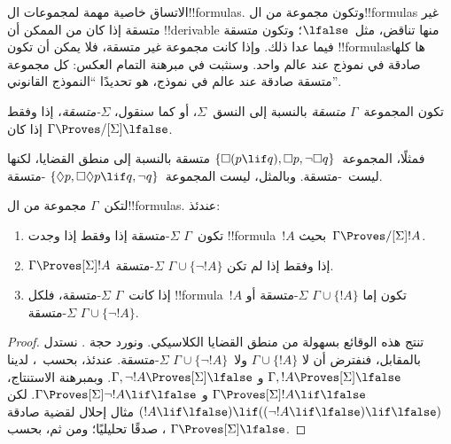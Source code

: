 \documentclass[../../../include/open-logic-section]{subfiles}
\begin{document}


الاتساق خاصية مهمة لمجموعات ال!!{formula}s. وتكون مجموعة من
ال!!{formula}s غير متسقة إذا كان من الممكن أن !!{derivable} منها تناقض،
مثل~$\lfalse$؛ وتكون متسقة فيما عدا ذلك. وإذا كانت مجموعة غير متسقة،
فلا يمكن أن تكون !!{formula}sها كلها صادقة في نموذج عند عالم واحد.
وسنثبت في مبرهنة التمام العكس: كل مجموعة متسقة صادقة عند عالم في نموذج،
هو تحديدًا ``النموذج القانوني''.

\begin{defn}
  تكون المجموعة~$\Gamma$ \emph{متسقة} بالنسبة إلى النسق~$\Sigma$، أو
  كما سنقول، \emph{$\Sigma$-متسقة}، إذا وفقط إذا كان
  $\Gamma \Proves/[\Sigma] \lfalse$.
\end{defn}

فمثلًا، المجموعة~$\{\Box(p \lif q), \Box p, \lnot\Box q\}$ متسقة
بالنسبة إلى منطق القضايا، لكنها ليست~-متسقة. وبالمثل، ليست
المجموعة~$\{\Diamond p, \Box\Diamond p \lif q, \lnot q\}$
-متسقة.

\begin{prop}
  لتكن~$\Gamma$ مجموعة من ال!!{formula}s. عندئذ:
  \begin{enumerate}
  \item تكون~$\Gamma$ $\Sigma$-متسقة إذا وفقط إذا وجدت
    !!{formula}~$!A$ بحيث~$\Gamma \Proves/[\Sigma] !A$.
  \item {}%
    $\Gamma \Proves[\Sigma] !A$ إذا وفقط إذا لم تكن
    $\Gamma \cup \{\lnot!A\}$ $\Sigma$-متسقة.
  \item {}%
    إذا كانت~$\Gamma$ $\Sigma$-متسقة، فلكل !!{formula}~$!A$ تكون إما
    $\Gamma \cup \{!A\}$ $\Sigma$-متسقة أو
    $\Gamma \cup \{\lnot!A\}$ $\Sigma$-متسقة.
  \end{enumerate}
\end{prop}

\begin{proof}
  تنتج هذه الوقائع بسهولة من منطق القضايا الكلاسيكي. ونورد حجة
  . نستدل بالمقابل، فنفترض أن لا
  $\Gamma \cup \{!A\}$ ولا~$\Gamma \cup \{\lnot!A\}$
  $\Sigma$-متسقة. عندئذ، بحسب~، لدينا
  $\Gamma, !A \Proves[\Sigma] \lfalse$ و
  $\Gamma, \lnot !A \Proves[\Sigma] \lfalse$. وبمبرهنة الاستنتاج،
  $\Gamma \Proves[\Sigma] !A \lif \lfalse$ و
  $\Gamma \Proves[\Sigma] \lnot!A \lif \lfalse$. لكن
  $(!A \lif \lfalse) \lif ((\lnot!A \lif \lfalse) \lif \lfalse)$
  مثال إحلال لقضية صادقة صدقًا تحليليًا؛ ومن ثم، بحسب
  ،
  $\Gamma \Proves[\Sigma] \lfalse$.
\end{proof}
\end{document}
